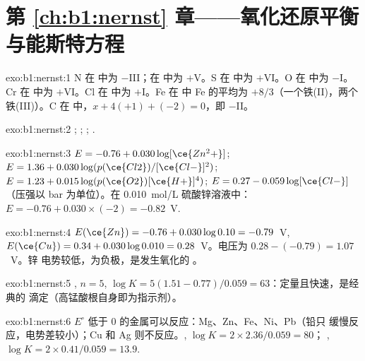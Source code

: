\section*{第 \ref{ch:b1:nernst} 章——氧化还原平衡与能斯特方程}

\begin{solution}{exo:b1:nernst:1}
N 在  中为 $-$III；在  中为 $+$V。S 在  中为 $+$VI。O 在
 中为 $-$I。Cr 在  中为 $+$VI。Cl 在  中为 $+$I。Fe 在
 中 Fe 的平均为 $+8/3$（一个铁(II)，两个铁(III)）。C 在
 中，$x + 4(+1) + (-2) = 0$，即 $-$II。
\end{solution}

\begin{solution}{exo:b1:nernst:2}
;
;
;
.
\end{solution}

\begin{solution}{exo:b1:nernst:3}
$E = -0.76 + 0.030\log[\ce{Zn^2+}]$; $E = 1.36 + 0.030\log(p(\ce{Cl2})/[\ce{Cl-}]^2)$;
$E = 1.23 + 0.015\log(p(\ce{O2})[\ce{H+}]^4)$; $E = 0.27 - 0.059\log[\ce{Cl-}]$
（压强以 bar 为单位）。在 \qty{0.010}{mol/L} 硫酸锌溶液中：
$E = -0.76 + 0.030 \times (-2) = -0.82$~V.
\end{solution}

\begin{solution}{exo:b1:nernst:4}
$E(\ce{Zn}) = -0.76 + 0.030\log 0.10 = -0.79$~V, $E(\ce{Cu}) = 0.34 +
0.030\log 0.010 = 0.28$~V。电压为 $0.28 - (-0.79) = 1.07$~V。锌
电势较低，为负极，是发生氧化的
。
\end{solution}

\begin{solution}{exo:b1:nernst:5}
, $n = 5$,
$\log K = 5(1.51 - 0.77)/0.059 = 63$：定量且快速，是经典的
滴定（高锰酸根自身即为指示剂）。
\end{solution}

\begin{solution}{exo:b1:nernst:6}
 $E^\circ$ 低于 0 的金属可以反应：Mg、Zn、Fe、Ni、Pb（铅只
缓慢反应，电势差较小）；Cu 和 Ag 则不反应。, $\log K = 2 \times 2.36/0.059 = 80$；
, $\log K = 2 \times 0.41/0.059 = 13.9$.
\end{solution}

